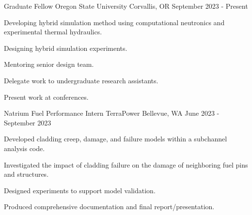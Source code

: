 
\begin{cventries}

  \cventry
    {Graduate Fellow} %
    {Oregon State University} %
    {Corvallis, OR} %
    {September 2023 - Present} %
    {
      \begin{cvitems} %
        \item{Developing hybrid simulation method using computational neutronics and experimental thermal hydraulics.}
        \item{Designing hybrid simulation experiments.}
        \item{Mentoring senior design team.}
        \item{Delegate work to undergraduate research assistants.}
        \item{Present work at conferences.}
      \end{cvitems}
    }

  \cventry
    {Natrium Fuel Performance Intern}
    {TerraPower}
    {Bellevue, WA}
    {June 2023 - September 2023}
    {
      \begin{cvitems}
          \item {Developed cladding creep, damage, and failure models within a subchannel analysis code.}
          \item {Investigated the impact of cladding failure on the damage of neighboring fuel pins and structures.}
          \item {Designed experiments to support model validation.}
          \item {Produced comprehensive documentation and final report/presentation.}
      \end{cvitems}
    }


\end{cventries}
